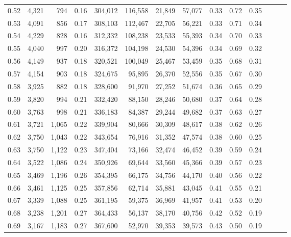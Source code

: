 \begin{tabular}{rrrrrrrrrrrrrr}
0.52 &   4,321 &    794 &  0.16 &  304,012 &  116,558 &  21,849 &  57,077 &  0.33 &  0.72 &      0.35 \\
0.53 &   4,091 &    856 &  0.17 &  308,103 &  112,467 &  22,705 &  56,221 &  0.33 &  0.71 &      0.34 \\
0.54 &   4,229 &    828 &  0.16 &  312,332 &  108,238 &  23,533 &  55,393 &  0.34 &  0.70 &      0.33 \\
0.55 &   4,040 &    997 &  0.20 &  316,372 &  104,198 &  24,530 &  54,396 &  0.34 &  0.69 &      0.32 \\
0.56 &   4,149 &    937 &  0.18 &  320,521 &  100,049 &  25,467 &  53,459 &  0.35 &  0.68 &      0.31 \\
0.57 &   4,154 &    903 &  0.18 &  324,675 &   95,895 &  26,370 &  52,556 &  0.35 &  0.67 &      0.30 \\
0.58 &   3,925 &    882 &  0.18 &  328,600 &   91,970 &  27,252 &  51,674 &  0.36 &  0.65 &      0.29 \\
0.59 &   3,820 &    994 &  0.21 &  332,420 &   88,150 &  28,246 &  50,680 &  0.37 &  0.64 &      0.28 \\
0.60 &   3,763 &    998 &  0.21 &  336,183 &   84,387 &  29,244 &  49,682 &  0.37 &  0.63 &      0.27 \\
0.61 &   3,721 &  1,065 &  0.22 &  339,904 &   80,666 &  30,309 &  48,617 &  0.38 &  0.62 &      0.26 \\
0.62 &   3,750 &  1,043 &  0.22 &  343,654 &   76,916 &  31,352 &  47,574 &  0.38 &  0.60 &      0.25 \\
0.63 &   3,750 &  1,122 &  0.23 &  347,404 &   73,166 &  32,474 &  46,452 &  0.39 &  0.59 &      0.24 \\
0.64 &   3,522 &  1,086 &  0.24 &  350,926 &   69,644 &  33,560 &  45,366 &  0.39 &  0.57 &      0.23 \\
0.65 &   3,469 &  1,196 &  0.26 &  354,395 &   66,175 &  34,756 &  44,170 &  0.40 &  0.56 &      0.22 \\
0.66 &   3,461 &  1,125 &  0.25 &  357,856 &   62,714 &  35,881 &  43,045 &  0.41 &  0.55 &      0.21 \\
0.67 &   3,339 &  1,088 &  0.25 &  361,195 &   59,375 &  36,969 &  41,957 &  0.41 &  0.53 &      0.20 \\
0.68 &   3,238 &  1,201 &  0.27 &  364,433 &   56,137 &  38,170 &  40,756 &  0.42 &  0.52 &      0.19 \\
0.69 &   3,167 &  1,183 &  0.27 &  367,600 &   52,970 &  39,353 &  39,573 &  0.43 &  0.50 &      0.19 \\

\end{tabular}
